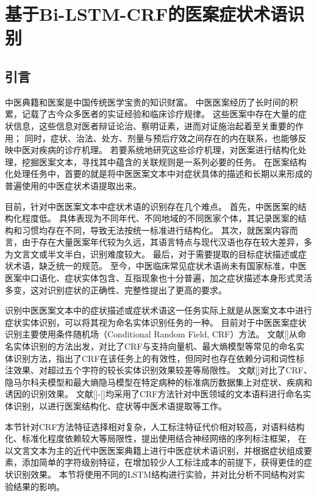 \section{基于Bi-LSTM-CRF的医案症状术语识别}
\subsection{引言}
中医典籍和医案是中国传统医学宝贵的知识财富。
中医医案经历了长时间的积累，记载了古今众多医者的实证经验和临床诊疗规律。
这些医案中存在大量的症状信息，这些信息对医者辩证论治、察明证素，进而对证施治起着至关重要的作用；
同时，症状、治法、处方、剂量与预后疗效之间存在的内在联系，也能够反映中医对疾病的诊疗机理。
若要系统地研究这些诊疗机理，对医案进行结构化处理，挖掘医案文本，寻找其中蕴含的关联规则是一系列必要的任务。
在医案结构化处理任务中，首要的就是将中医医案文本中对症状具体的描述和长期以来形成的普遍使用的中医症状术语提取出来。

目前，针对中医医案文本中症状术语的识别存在几个难点。
首先，中医医案的结构化程度低。
具体表现为不同年代、不同地域的不同医家个体，其记录医案的结构和习惯均存在不同，导致无法按统一标准进行结构化。
其次，就医案内容而言，由于存在大量医案年代较为久远，其语言特点与现代汉语也存在较大差异，多为文言文或半文半白，识别难度较大。
最后，对于需要提取的目标症状描述或症状术语，缺乏统一的规范。
至今，中医临床常见症状术语尚未有国家标准，中医医案中口语化、症状实体包含、互指现象也十分普遍，加之症状描述本身形式灵活多变，这对识别症状的正确性、完整性提出了更高的要求。

识别中医医案文本中的症状描述或症状术语这一任务实际上就是从医案文本中进行症状实体识别，可以将其视为命名实体识别任务的一种。
目前对于中医医案症状识别主要使用条件随机场（Conditional Random Field, CRF）方法。
文献[]从命名实体识别的方法出发，对比了CRF与支持向量机、最大熵模型等常见的命名实体识别方法，指出了CRF在该任务上的有效性，但同时也存在依赖分词和词性标注效果、对超过五个字符的较长实体识别效果较差等局限性。
文献[]对比了CRF、隐马尔科夫模型和最大熵隐马模型在特定病种的标准病历数据集上对症状、疾病和诱因的识别效果。
文献[]-[]均采用了CRF方法针对中医领域的文本语料进行命名实体识别，以进行医案结构化、症状等中医术语提取等工作。

本节针对CRF方法特征选择相对复杂，人工标注特征代价相对较高，对语料结构化、标准化程度依赖较大等局限性，提出使用结合神经网络的序列标注框架，
在以文言文本为主的近代中医医案典籍上进行中医症状术语识别，并根据症状组成要素，添加简单的字符级别特征，在增加较少人工标注成本的前提下，获得更佳的症状识别效果。
本节将使用不同的LSTM结构进行实验，并对比分析不同结构对实验结果的影响。

